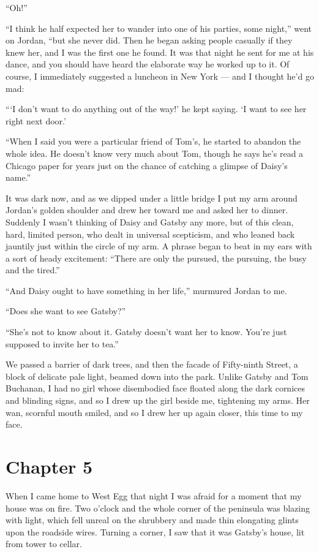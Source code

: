 \documentclass{znotebook}
\begin{document}
``Oh!''

``I think he half expected her to wander into one of his parties, some night,'' went on Jordan, ``but she never did. Then he began asking people casually if they knew her, and I was the first one he found. It was that night he sent for me at his dance, and you should have heard the elaborate way he worked up to it. Of course, I immediately suggested a luncheon in New York — and I thought he’d go mad:

``‘I don’t want to do anything out of the way!’ he kept saying. ‘I want to see her right next door.’

``When I said you were a particular friend of Tom’s, he started to abandon the whole idea. He doesn’t know very much about Tom, though he says he’s read a Chicago paper for years just on the chance of catching a glimpse of Daisy’s name.''

It was dark now, and as we dipped under a little bridge I put my arm around Jordan’s golden shoulder and drew her toward me and asked her to dinner. Suddenly I wasn’t thinking of Daisy and Gatsby any more, but of this clean, hard, limited person, who dealt in universal scepticism, and who leaned back jauntily just within the circle of my arm. A phrase began to beat in my ears with a sort of heady excitement: ``There are only the pursued, the pursuing, the busy and the tired.''

``And Daisy ought to have something in her life,'' murmured Jordan to me.

``Does she want to see Gatsby?''

``She’s not to know about it. Gatsby doesn’t want her to know. You’re just supposed to invite her to tea.''

We passed a barrier of dark trees, and then the facade of Fifty-ninth Street, a block of delicate pale light, beamed down into the park. Unlike Gatsby and Tom Buchanan, I had no girl whose disembodied face floated along the dark cornices and blinding signs, and so I drew up the girl beside me, tightening my arms. Her wan, scornful mouth smiled, and so I drew her up again closer, this time to my face.

\chapter{Chapter 5}

When I came home to West Egg that night I was afraid for a moment that my house was on fire. Two o’clock and the whole corner of the peninsula was blazing with light, which fell unreal on the shrubbery and made thin elongating glints upon the roadside wires. Turning a corner, I saw that it was Gatsby’s house, lit from tower to cellar.
\end{document}
